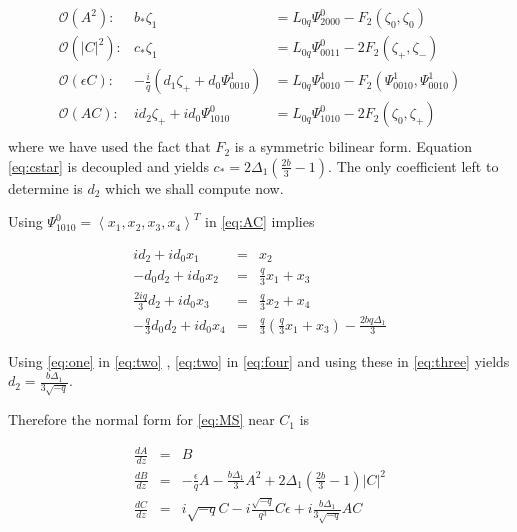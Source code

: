 \begin{subequations}
\begin{eqnarray}
\mathcal{O}(A^2): &		b_* \zeta_1 &= L_{0q} \Psi_{2000}^0 - F_2(\zeta_0,\zeta_0) \\
\mathcal{O}(\left|C\right|^2):&	c_* \zeta_1 &= L_{0q} \Psi_{0011}^0 -2 F_2(\zeta_+,\zeta_-) \label{eq:cstar} \\
\mathcal{O}(\epsilon C): &-\frac{i}{q} \left(d_1 \zeta_+ +  d_0 \Psi_{0010}^1\right) &= L_{0q} \Psi_{0010}^1 - F_2(\Psi_{0010}^1,\Psi_{0010}^1) \\
\mathcal{O}(A C): 	&i d_2 \zeta_+ + i d_0 \Psi_{1010}^0 &= L_{0q} \Psi_{1010}^0 - 2 F_2(\zeta_0,\zeta_+) \\ \label{eq:AC}
\end{eqnarray}
\end{subequations}
where we have used the fact that $F_2$ is a symmetric bilinear form. Equation \eqref{eq:cstar} is decoupled and yields 
$ c_* = 2 \Delta_1 \left( \frac{2 b}{3}  - 1\right)$. The only coefficient left to determine is $d_2$ which we shall compute now. 

Using $\Psi_{1010}^0 = \left<x_1,x_2,x_3,x_4\right>^T$ in \eqref{eq:AC} implies 

\begin{subequations}
\begin{eqnarray}
i d_2 + i d_0 x_1 &=& x_2 \label{eq:one} \\
- d_0 d_2 + i d_0 x_2 &=& \frac{q}{3} x_1 + x_3 \label{eq:two} \\
\frac{2 i q}{3} d_2 + i d_0 x_3 &=& \frac{q}{3} x_2 + x_4  \label{eq:three} \\
- \frac{q}{3} d_0 d_2 + i d_0 x_4 &=& \frac{q}{3}\left(\frac{q}{3} x_1 + x_3 \right) - \frac{ 2 b q \Delta_1} {3} \label{eq:four}
\end{eqnarray}
\end{subequations}

Using \eqref{eq:one} in \eqref{eq:two} , \eqref{eq:two} in \eqref{eq:four} and using these in \eqref{eq:three} yields $ d_2 = \frac{ b \Delta_1 }{ 3 \sqrt{-q} } $.

Therefore the normal form for \eqref{eq:MS} near $C_1$ is 

\begin{subequations}
\begin{eqnarray} \label{eq:NORML}
\frac{dA}{dz} &=& B \\ \label{eq:normalA}
\frac{dB}{dz} &=& -\frac{\epsilon}{q} A - \frac{b \Delta_1 }{3} A^2 + 2 \Delta_1 \left(\frac{2 b }{3} - 1\right) \left|C\right|^2 \\ \label{eq:normalB}
\frac{dC}{dz} &=& i \sqrt{-q} C - i \frac{\sqrt{-q} }{q^3} C\epsilon + i \frac{b \Delta_1}{3 \sqrt{-q}} A C \label{eq:normalC}
\end{eqnarray}
\end{subequations}

